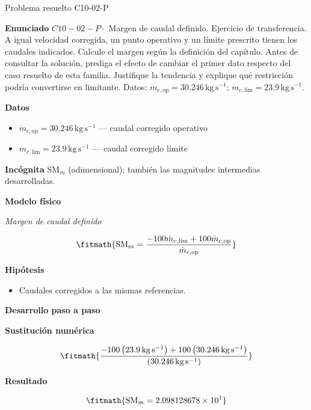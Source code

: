 \documentclass[10pt,openany]{book}
\begin{document}
\begin{studiumworked}{Problema resuelto C10-02-P}


\noindent\textbf{Enunciado}
\(C10-02-P \cdot\) Margen de caudal definido. Ejercicio de transferencia. A igual velocidad corregida, un punto operativo y un límite prescrito tienen los caudales indicados. Calcule el margen según la definición del capítulo. Antes de consultar la solución, prediga el efecto de cambiar el primer dato respecto del caso resuelto de esta familia. Justifique la tendencia y explique qué restricción podría convertirse en limitante. Datos: \(\dot{m}_{c,\mathrm{op}}=30.246\, \mathrm{kg}\,\mathrm{s}^{-1}\); \(\dot{m}_{c,\mathrm{lim}}=23.9\, \mathrm{kg}\,\mathrm{s}^{-1}\).

\noindent\textbf{Datos}
\begin{itemize}
\item $\dot{m}_{c,\mathrm{op}} = 30.246\,\mathrm{kg}\,\mathrm{s}^{-1}$ — caudal corregido operativo
\item $\dot{m}_{c,\mathrm{lim}} = 23.9\,\mathrm{kg}\,\mathrm{s}^{-1}$ — caudal corregido límite
\end{itemize}

\noindent\textbf{Incógnita}
$\mathrm{SM}_m$ (adimensional); también las magnitudes intermedias desarrolladas.

\noindent\textbf{Modelo físico}

\noindent\textit{Margen de caudal definido}

\[
\fitmath{\mathrm{SM}_m=\frac{- 100 \dot{m}_{c,\mathrm{lim}} + 100 \dot{m}_{c,\mathrm{op}}}{\dot{m}_{c,\mathrm{op}}}}
\]

\noindent\textbf{Hipótesis}
\begin{itemize}
\item Caudales corregidos a las mismas referencias.
\end{itemize}

\noindent\textbf{Desarrollo paso a paso}



\noindent\textbf{Sustitución numérica}

\[
\fitmath{\frac{- 100 \left(23.9\,\mathrm{kg}\,\mathrm{s}^{-1}\right) + 100 \left(30.246\,\mathrm{kg}\,\mathrm{s}^{-1}\right)}{\left(30.246\,\mathrm{kg}\,\mathrm{s}^{-1}\right)}}
\]

\noindent\textbf{Resultado}

\[
\fitmath{\mathrm{SM}_m=2.098128678\times10^{1}}
\]


\end{studiumworked}
\end{document}
